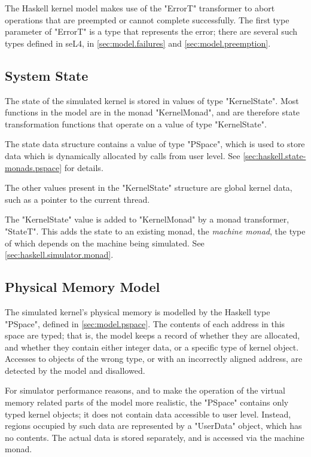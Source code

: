 The Haskell kernel model makes use of the "ErrorT" transformer to abort operations that are preempted or cannot complete successfully. The first type parameter of "ErrorT" is a type that represents the error; there are several such types defined in seL4, in \autoref{sec:model.failures} and \autoref{sec:model.preemption}.

\subsection{System State}
\label{sec:haskell.state-monads.system-state}

The state of the simulated kernel is stored in values of type "KernelState". Most functions in the model are in the monad "KernelMonad", and are therefore state transformation functions that operate on a value of type "KernelState".

The state data structure contains a value of type "PSpace", which is used to store data which is dynamically allocated by calls from user level. See \autoref{sec:haskell.state-monads.pspace} for details.

The other values present in the "KernelState" structure are global kernel data, such as a pointer to the current thread.

The "KernelState" value is added to "KernelMonad" by a monad transformer, "StateT". This adds the state to an existing monad, the \emph{machine monad}, the type of which depends on the machine being simulated. See \autoref{sec:haskell.simulator.monad}.

\subsection{Physical Memory Model}\label{sec:haskell.state-monads.pspace}

The simulated kernel's physical memory is modelled by the Haskell type "PSpace", defined in \autoref{sec:model.pspace}. The contents of each address in this space are typed; that is, the model keeps a record of whether they are allocated, and whether they contain either integer data, or a specific type of kernel object. Accesses to objects of the wrong type, or with an incorrectly aligned address, are detected by the model and disallowed.

For simulator performance reasons, and to make the operation of the virtual memory related parts of the model more realistic, the "PSpace" contains only typed kernel objects; it does not contain data accessible to user level. Instead, regions occupied by such data are represented by a "UserData" object, which has no contents. The actual data is stored separately, and is accessed via the machine monad.

